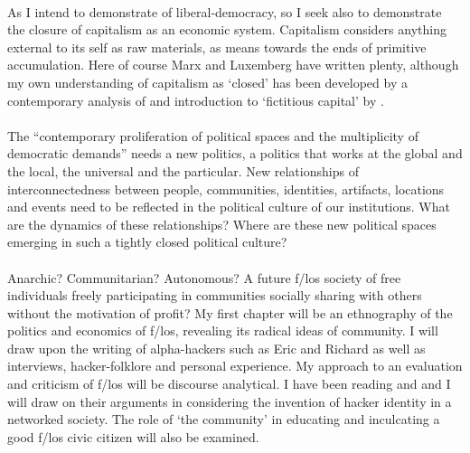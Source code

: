 \documentclass{article}
\begin{document}
\begin{doublespace}
\paragraph{}As I intend to demonstrate of liberal-democracy, so I seek also to demonstrate the closure of capitalism as an economic system. Capitalism considers anything external to its self as raw materials, as means towards the ends of primitive accumulation. Here of course Marx and Luxemberg have written plenty, although my own understanding of capitalism as `closed' has been developed by a contemporary analysis of and introduction to `fictitious capital' by . 

\paragraph{}The ``contemporary proliferation of political spaces and the multiplicity of democratic demands'' \cite[p.17]{Mouffe:2000fk} needs a new politics, a politics that works at the global and the local, the universal and the particular. New relationships of interconnectedness between people, communities, identities, artifacts, locations and events need to be reflected in the political culture of our institutions. What are the dynamics of these relationships? Where are these new political spaces emerging in such a tightly closed political culture?

\paragraph{}Anarchic? Communitarian? Autonomous? A future f/los society of free individuals freely participating in communities socially sharing with others without the motivation of profit? My first chapter will be an ethnography of the politics and economics of f/los, revealing its radical ideas of community. I will draw upon the writing of alpha-hackers such as Eric  and Richard  as well as interviews, hacker-folklore and personal experience. My approach to an evaluation and criticism of f/los will be discourse analytical. I have been reading  and  and I will draw on their arguments in considering the invention of hacker identity in a networked society. The role of `the community' in educating and inculcating a good f/los civic citizen will also be examined.


\end{doublespace}
\end{document}
